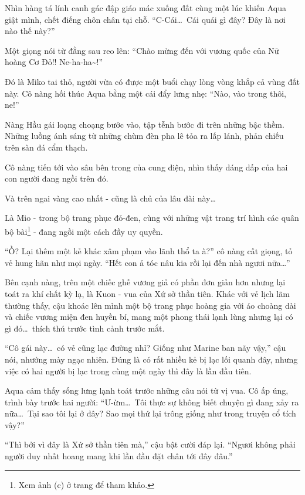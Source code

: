 \documentclass[../main.tex]{subfiles}
\begin{document}
Nhìn hàng tá lính canh gác đập giáo mác xuống đất cùng một lúc khiến Aqua giật mình, chết điếng chôn chân tại chỗ. ``C-Cái\dots\ Cái quái gì đây? Đây là nơi nào thế này?''

Một giọng nói từ đằng sau reo lên: ``Chào mừng đến với vương quốc của Nữ hoàng Cơ Đỏ!! Ne-ha-ha\~{}!''

Đó là Miko tai thỏ, người vừa có được một buổi chạy lòng vòng khắp cả vùng đất này. Cô nàng hối thúc Aqua bằng một cái đẩy lưng nhẹ: ``Nào, vào trong thôi, ne!''

Nàng Hầu gái loạng choạng bước vào, tập tễnh bước đi trên những bậc thềm. Những luồng ánh sáng từ những chùm đèn pha lê tỏa ra lấp lánh, phản chiếu trên sàn đá cẩm thạch.

Cô nàng tiến tới vào sâu bên trong của cung điện, nhìn thấy dáng dấp của hai con người đang ngồi trên đó.

Và trên ngai vàng cao nhất - cũng là chủ của lâu đài này\dots

Là Mio - trong bộ trang phục đỏ-đen, cùng với những vật trang trí hình các quân bộ bài\footnote{Xem ảnh (c) ở trang \pageref{wonderland} để tham khảo.} - đang ngồi một cách đầy uy quyền.

``Ồ? Lại thêm một kẻ khác xâm phạm vào lãnh thổ ta à?'' cô nàng cất giọng, tỏ vẻ hung hãn như mọi ngày. ``Hết con ả tóc nâu kia rồi lại đến nhà ngươi nữa\dots''

Bên cạnh nàng, trên một chiếc ghế vương giả có phần đơn giản hơn nhưng lại toát ra khí chất kỳ lạ, là Kuon - vua của Xứ sở thần tiên. Khác với vẻ lịch lãm thường thấy, cậu khoác lên mình một bộ trang phục hoàng gia với áo choàng dài và chiếc vương miện đen huyền bí, mang một phong thái lạnh lùng nhưng lại có gì đó\dots\ thích thú trước tình cảnh trước mắt.

``Cô gái này\dots\ có vẻ cũng lạc đường nhỉ? Giống như Marine ban nãy vậy,'' cậu nói, nhướng mày ngạc nhiên. Đúng là có rất nhiều kẻ bị lạc lối quanh đây, nhưng việc có hai người bị lạc trong cùng một ngày thì đây là lần đầu tiên.

Aqua cảm thấy sống lưng lạnh toát trước những câu nói từ vị vua. Cô ấp úng, trình bày trước hai người: ``Ư-ừm\dots\ Tôi thực sự không biết chuyện gì đang xảy ra nữa\dots\ Tại sao tôi lại ở đây? Sao mọi thứ lại trông giống như trong truyện cổ tích vậy?''

``Thì bởi vì đây là Xứ sở thần tiên mà,'' cậu bật cười đáp lại. ``Ngươi không phải người duy nhất hoang mang khi lần đầu đặt chân tới đây đâu.''
\end{document}
